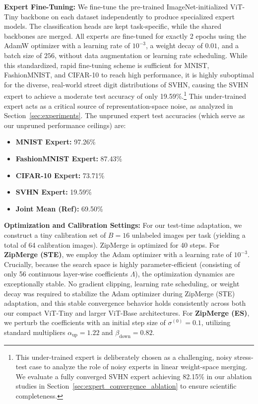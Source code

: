 \textbf{Expert Fine-Tuning:}
We fine-tune the pre-trained ImageNet-initialized ViT-Tiny backbone on each dataset independently to produce specialized expert models. The classification heads are kept task-specific, while the shared backbones are merged. All experts are fine-tuned for exactly 2 epochs using the AdamW optimizer with a learning rate of $10^{-3}$, a weight decay of $0.01$, and a batch size of $256$, without data augmentation or learning rate scheduling. While this standardized, rapid fine-tuning scheme is sufficient for MNIST, FashionMNIST, and CIFAR-10 to reach high performance, it is highly suboptimal for the diverse, real-world street digit distributions of SVHN, causing the SVHN expert to achieve a moderate test accuracy of only 19.59\%.\footnote{This under-trained expert is deliberately chosen as a challenging, noisy stress-test case to analyze the role of noisy experts in linear weight-space merging. We evaluate a fully converged SVHN expert achieving 82.15\% in our ablation studies in Section~\ref{sec:expert_convergence_ablation} to ensure scientific completeness.} This under-trained expert acts as a critical source of representation-space noise, as analyzed in Section~\ref{sec:experiments}. The unpruned expert test accuracies (which serve as our unpruned performance ceilings) are:
\begin{itemize}[leftmargin=*]
    \item \textbf{MNIST Expert:} 97.26\%
    \item \textbf{FashionMNIST Expert:} 87.43\%
    \item \textbf{CIFAR-10 Expert:} 73.71\%
    \item \textbf{SVHN Expert:} 19.59\%
    \item \textbf{Joint Mean (Ref):} 69.50\%
\end{itemize}

\textbf{Optimization and Calibration Settings:}
For our test-time adaptation, we construct a tiny calibration set of $B=16$ unlabeled images per task (yielding a total of 64 calibration images). ZipMerge is optimized for 40 steps. For \textbf{ZipMerge (STE)}, we employ the Adam optimizer with a learning rate of $10^{-3}$. Crucially, because the search space is highly parameter-efficient (consisting of only 56 continuous layer-wise coefficients $\Lambda$), the optimization dynamics are exceptionally stable. No gradient clipping, learning rate scheduling, or weight decay was required to stabilize the Adam optimizer during ZipMerge (STE) adaptation, and this stable convergence behavior holds consistently across both our compact ViT-Tiny and larger ViT-Base architectures. For \textbf{ZipMerge (ES)}, we perturb the coefficients with an initial step size of $\sigma^{(0)}=0.1$, utilizing standard multipliers $\alpha_{\text{up}}=1.22$ and $\beta_{\text{down}}=0.82$.

